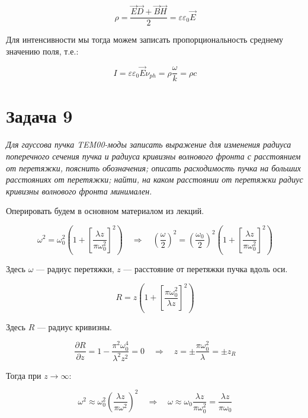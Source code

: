 \documentclass[a4paper, 12pt]{article}
\newcommand{\qrq}
{\ensuremath{\quad \Rightarrow \quad}} %
\renewcommand{\epsilon}{\varepsilon} %
\begin{document}
\begin{equation}
	\rho = \frac{\vec{E}\vec{D} + \vec{B}\vec{H}}{2} = \epsilon \epsilon_0 \vec{E}
\end{equation}

Для интенсивности мы тогда можем записать пропорциональность среднему значению поля, т.е.:

\begin{equation}
	I = \epsilon \epsilon_0 \vec{E} \nu_{ph} = \rho \frac{\omega}{k} = \rho c
\end{equation}

\section{Задача 9}

\textit{Для гауссова пучка TEM00-моды записать выражение для изменения радиуса поперечного
	сечения пучка и радиуса кривизны волнового фронта с расстоянием от перетяжки, пояснить
	обозначения; описать расходимость пучка на больших расстояниях от перетяжки; найти, на
	каком расстоянии от перетяжки радиус кривизны волнового фронта минимален.
}

Оперировать будем в основном материалом из лекций.

\begin{equation}
	\omega^2 = \omega_0^2 \left(1 + \left[\frac{\lambda z}{\pi \omega_0^2}\right]^2\right) \qrq \left(\frac{\omega}{2}\right)^2 = \left(\frac{\omega_0}{2}\right)^2 \left(1 + \left[\frac{\lambda z}{\pi \omega_0^2}\right]^2\right)
\end{equation}

Здесь $\omega$ --- радиус перетяжки, $z$ --- расстояние от перетяжки пучка вдоль оси.

\begin{equation}
	R = z \left(1 + \left[\frac{\pi \omega_0^2}{\lambda z}\right]^ 2\right)
\end{equation}

Здесь $R$ --- радиус кривизны.

\begin{equation}
	\frac{\partial R}{\partial z} = 1 - \frac{\pi^2 \omega_0^4}{\lambda^2 z^2} = 0 \qrq z = \pm \frac{\pi \omega_0^2}{\lambda} = \pm z_R
\end{equation}

Тогда при $z \rightarrow \infty$:

\begin{equation}
	\omega^2 \approx \omega_0^2 \left(\frac{\lambda z}{\pi \omega^2}\right)^2 \qrq \omega \approx \omega_0 \frac{\lambda z}{\pi\omega_0^2} = \frac{\lambda z}{\pi \omega_0}
\end{equation}
\end{document}
